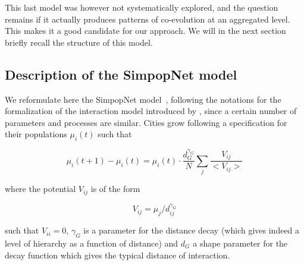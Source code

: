 \documentclass[graybox]{svmult}
\begin{document}
This last model was however not systematically explored, and the question remains if it actually produces patterns of co-evolution at an aggregated level. This makes it a good candidate for our approach. We will in the next section briefly recall the structure of this model.



\subsection{Description of the SimpopNet model}


We reformulate here the SimpopNet model~\cite{schmitt2014modelisation}, following the notations for the formalization of the interaction model introduced by \cite{raimbault2018indirect}, since a certain number of parameters and processes are similar. Cities grow following a specification for their populations $\mu_i(t)$ such that

\begin{equation}
\mu_i(t+1) - \mu_i (t) = \mu_i (t) \cdot \frac{d_G^{\gamma_G}}{N} \sum_{j} \frac{V_{ij}}{<V_{ij}>}
\end{equation}

where the potential $V_{ij}$ is of the form 

\begin{equation}
V_{ij} = \mu_j / d_{ij}^{\gamma_G}
\end{equation}

such that $V_{ii}=0$, $\gamma_G$ is a parameter for the distance decay (which gives indeed a level of hierarchy as a function of distance) and $d_G$ a shape parameter for the decay function which gives the typical distance of interaction.

\end{document}
